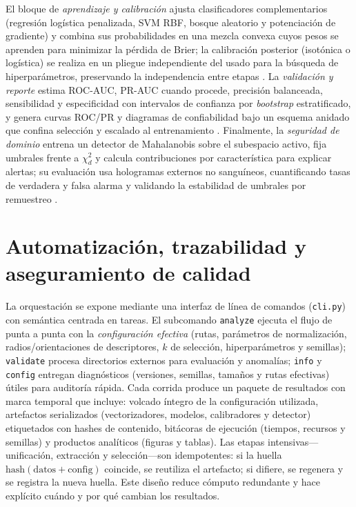 El bloque de \emph{aprendizaje y calibración} ajusta clasificadores complementarios (regresión logística penalizada, SVM RBF, bosque aleatorio y potenciación de gradiente) y combina sus probabilidades en una mezcla convexa cuyos pesos se aprenden para minimizar la pérdida de Brier; la calibración posterior (isotónica o logística) se realiza en un pliegue independiente del usado para la búsqueda de hiperparámetros, preservando la independencia entre etapas \cite{Pedregosa2011,Friedman2001}. La \emph{validación y reporte} estima ROC-AUC, PR-AUC cuando procede, precisión balanceada, sensibilidad y especificidad con intervalos de confianza por \emph{bootstrap} estratificado, y genera curvas ROC/PR y diagramas de confiabilidad bajo un esquema anidado que confina selección y escalado al entrenamiento \cite{Vabalas2019,Tsamardinos2022}. Finalmente, la \emph{seguridad de dominio} entrena un detector de Mahalanobis sobre el subespacio activo, fija umbrales frente a \(\chi^{2}_{d}\) y calcula contribuciones por característica para explicar alertas; su evaluación usa hologramas externos no sanguíneos, cuantificando tasas de verdadera y falsa alarma y validando la estabilidad de umbrales por remuestreo \cite{Mahalanobis1936,Rousseeuw2019}.

\section{Automatización, trazabilidad y aseguramiento de calidad}
La orquestación se expone mediante una interfaz de línea de comandos (\texttt{cli.py}) con semántica centrada en tareas. El subcomando \texttt{analyze} ejecuta el flujo de punta a punta con la \emph{configuración efectiva} (rutas, parámetros de normalización, radios/orientaciones de descriptores, \(k\) de selección, hiperparámetros y semillas); \texttt{validate} procesa directorios externos para evaluación y anomalías; \texttt{info} y \texttt{config} entregan diagnósticos (versiones, semillas, tamaños y rutas efectivas) útiles para auditoría rápida. Cada corrida produce un paquete de resultados con marca temporal que incluye: volcado íntegro de la configuración utilizada, artefactos serializados (vectorizadores, modelos, calibradores y detector) etiquetados con hashes de contenido, bitácoras de ejecución (tiempos, recursos y semillas) y productos analíticos (figuras y tablas). Las etapas intensivas—unificación, extracción y selección—son idempotentes: si la huella \(\mathrm{hash}(\text{datos}+\text{config})\) coincide, se reutiliza el artefacto; si difiere, se regenera y se registra la nueva huella. Este diseño reduce cómputo redundante y hace explícito cuándo y por qué cambian los resultados.

